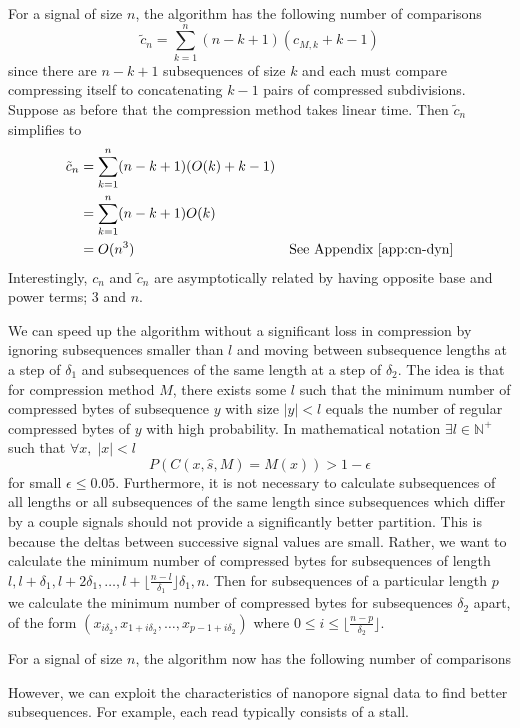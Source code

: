 
For a signal of size $n$, the algorithm has the following number of comparisons
\[ \tilde c_n = \sum_{k=1}^n(n-k+1)(c_{M,k}+k-1) \]
since there are $n-k+1$ subsequences of size $k$ and each must compare compressing itself to concatenating $k-1$ pairs of compressed subdivisions.
Suppose as before that the compression method takes linear time. Then $\tilde c_n$ simplifies to
\begin{align*}
	\tilde c_n &= \sum_{k=1}^n(n-k+1)(O(k)+k-1)\\
	&= \sum_{k=1}^n(n-k+1)O(k)\\
	&= O(n^3) &\text{See Appendix \ref{app:cn-dyn}}
\end{align*}
Interestingly, $c_n$ and $\tilde c_n$ are asymptotically related by having opposite base and power terms; 3 and $n$.


We can speed up the algorithm without a significant loss in compression by ignoring subsequences smaller than $l$ and moving between subsequence lengths at a step of $\delta_1$ and subsequences of the same length at a step of $\delta_2$.
The idea is that for compression method $M$, there exists some $l$ such that the minimum number of compressed bytes of subsequence $y$ with size $|y|<l$ equals the number of regular compressed bytes of $y$ with high probability.
In mathematical notation $\exists l\in\mathbb{N}^+$ such that $\forall x,\;|x|<l$
\[ P(C(x,\hat s,M)=M(x))> 1-\epsilon\]
for small $\epsilon \le 0.05$.
Furthermore, it is not necessary to calculate subsequences of all lengths or all subsequences of the same length since subsequences which differ by a couple signals should not provide a significantly better partition. This is because the deltas between successive signal values are small.
Rather, we want to calculate the minimum number of compressed bytes for subsequences of length $l,l+\delta_1,l+2\delta_1,\dots,l + \lfloor\frac{n-l}{\delta_1}\rfloor\delta_1, n$.
Then for subsequences of a particular length $p$ we calculate the minimum number of compressed bytes for subsequences $\delta_2$ apart, of the form $(x_{i\delta_2},x_{1+i\delta_2},\dots,x_{p-1+ i\delta_2})$ where $0\le i\le \lfloor \frac{n-p}{\delta_2} \rfloor$.


For a signal of size $n$, the algorithm now has the following number of comparisons

However, we can exploit the characteristics of nanopore signal data to find better subsequences.
For example, each read typically consists of a stall.

